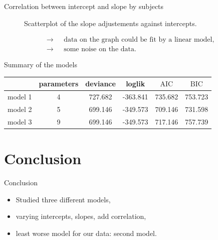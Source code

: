 \documentclass[unknownkeysallowed]{beamer}
\newcommand*{\AIC}{\mathrm{AIC}}
\newcommand*{\BIC}{\mathrm{BIC}}
\begin{document}
\begin{frame}{Correlation between intercept and slope by subjects}
\begin{onlyenv}
\begin{figure}[H]
    \caption{Scatterplot of the slope adjustements against intercepts.}
    \end{figure}
\begin{align*}
    \longrightarrow \text{ }&\text{data on the graph could be fit by a linear model},\\
    \longrightarrow \text{ }& \text{some noise on the data}.
\end{align*}
\end{onlyenv}
\end{frame}

\begin{frame}{Summary of the models}
\begin{center}
    \begin{tabular}{|c|c|c|c|c|c|}
    \hline
         & parameters & deviance & loglik & $\AIC$ & $\BIC$ \\
         \hline \hline
        model 1 & 4 & 727.682 & -363.841 & 735.682 & 753.723\\
        model 2 & 5 & 699.146 & -349.573 & 709.146 & 731.598\\
        model 3 & 9 & 699.146 & -349.573 &717.146 & 757.739\\
        \hline
    \end{tabular}
\end{center}
\end{frame}

\section{Conclusion}

\begin{frame}{Conclusion}
\begin{itemize}
    \item Studied three different models,
    \item varying intercepts, slopes, add correlation, 
    \item least worse model for our data: second model.
\end{itemize}
\end{frame}
\end{document}
